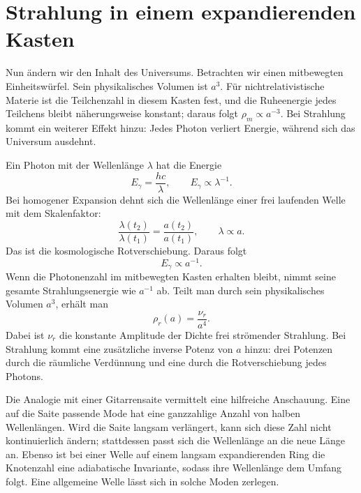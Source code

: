\section{Strahlung in einem expandierenden Kasten}

Nun ändern wir den Inhalt des Universums. Betrachten wir einen mitbewegten Einheitswürfel. Sein physikalisches Volumen ist \(a^3\). Für nichtrelativistische Materie ist die Teilchenzahl in diesem Kasten fest, und die Ruheenergie jedes Teilchens bleibt näherungsweise konstant; daraus folgt \(\rho_m\propto a^{-3}\). Bei Strahlung kommt ein weiterer Effekt hinzu: Jedes Photon verliert Energie, während sich das Universum ausdehnt.

Ein Photon mit der Wellenlänge \(\lambda\) hat die Energie
\begin{equation}
E_\gamma=\frac{hc}{\lambda},
\qquad
E_\gamma\propto\lambda^{-1}.
\label{eq:c02-photon-energy}
\end{equation}
Bei homogener Expansion dehnt sich die Wellenlänge einer frei laufenden Welle mit dem Skalenfaktor:
\begin{equation}
\frac{\lambda(t_2)}{\lambda(t_1)}
=\frac{a(t_2)}{a(t_1)},
\qquad
\lambda\propto a.
\label{eq:c02-redshift}
\end{equation}
Das ist die kosmologische Rotverschiebung. Daraus folgt
\begin{equation}
E_\gamma\propto a^{-1}.
\label{eq:c02-photon-redshift}
\end{equation}
Wenn die Photonenzahl im mitbewegten Kasten erhalten bleibt, nimmt seine gesamte Strahlungsenergie wie \(a^{-1}\) ab. Teilt man durch sein physikalisches Volumen \(a^3\), erhält man
\begin{equation}
\boxed{\rho_r(a)=\frac{\nu_r}{a^4}.}
\label{eq:c02-radiation-density}
\end{equation}
Dabei ist \(\nu_r\) die konstante Amplitude der Dichte frei strömender Strahlung. Bei Strahlung kommt eine zusätzliche inverse Potenz von \(a\) hinzu: drei Potenzen durch die räumliche Verdünnung und eine durch die Rotverschiebung jedes Photons.

Die Analogie mit einer Gitarrensaite vermittelt eine hilfreiche Anschauung. Eine auf die Saite passende Mode hat eine ganzzahlige Anzahl von halben Wellenlängen. Wird die Saite langsam verlängert, kann sich diese Zahl nicht kontinuierlich ändern; stattdessen passt sich die Wellenlänge an die neue Länge an. Ebenso ist bei einer Welle auf einem langsam expandierenden Ring die Knotenzahl eine adiabatische Invariante, sodass ihre Wellenlänge dem Umfang folgt. Eine allgemeine Welle lässt sich in solche Moden zerlegen.

